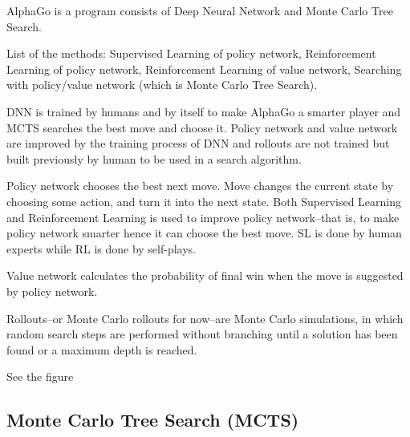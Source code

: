 \documentclass[11pt]{article}
\begin{document}
	AlphaGo is a program consists of Deep Neural Network and Monte Carlo Tree Search. 
	
	List of the methods: Supervised Learning of policy network, Reinforcement Learning of policy network, Reinforcement Learning of value network, Searching with policy/value network (which is Monte Carlo Tree Search).
	
	DNN is trained by humans and by itself to make AlphaGo a smarter player and MCTS searches the best move and choose it. Policy network and value network are improved by the training process of DNN and rollouts are not trained but built previously by human to be used in a search algorithm. %

	Policy network chooses the best next move. Move changes the current state by choosing some action, and turn it into the next state. Both Supervised Learning and Reinforcement Learning is used to improve policy network--that is, to make policy network smarter hence it can choose the best move. SL is done by human experts while RL is done by self-plays.
	
	Value network calculates the probability of final win when the move is suggested by policy network.
	
	Rollouts--or Monte Carlo rollouts for now--are Monte Carlo simulations, in which random search steps are performed without branching until a solution has been found or a maximum depth is reached.
	
	
	See the figure %
	
	
	
	
%	
%	
	
	
	\subsection{Monte Carlo Tree Search (MCTS)}
	
\end{document}
